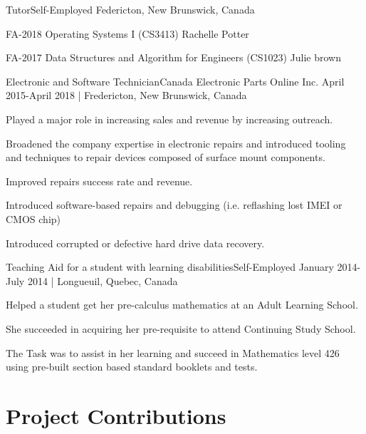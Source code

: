 \documentclass[english,letterpaper]{deedy-resume-openfont}
\begin{document}
\begin{flushleft}
    \employement%
        {Tutor}{Self-Employed}
        {Federicton, New Brunswick, Canada}{%
        \begin{tightemize}
        \item FA-2018 Operating Systems I (CS3413) Rachelle Potter
        \item FA-2017 Data Structures and Algorithm for Engineers (CS1023) Julie brown
        \end{tightemize}
        }

    \employement%
        {Electronic and Software Technician}{Canada Electronic Parts Online Inc.}
        {April 2015-April 2018 | Fredericton, New Brunswick, Canada}{%
        \begin{tightemize}
        \item Played a major role in increasing sales and revenue by increasing outreach.
        \item Broadened the company expertise in electronic repairs and introduced tooling and techniques to repair devices composed of surface mount components.
        \item Improved repairs success rate and revenue.
        \item Introduced software-based repairs and debugging (i.e. reflashing lost IMEI or CMOS chip)
        \item Introduced corrupted or defective hard drive data recovery.
        \end{tightemize}
        }

    \employement%
        {Teaching Aid for a student with learning disabilities}{Self-Employed}
        {January 2014-July 2014 | Longueuil, Quebec, Canada}{%
        \begin{tightemize}
        \item Helped a student get her pre-calculus mathematics at an Adult Learning School.
        \item She succeeded in acquiring her pre-requisite to attend Continuing Study School.
        \item The Task was to assist in her learning and succeed in Mathematics level 426 using pre-built section based standard booklets and tests.
        \end{tightemize}
        }


\section{Project Contributions}


\end{flushleft}
\end{document}
